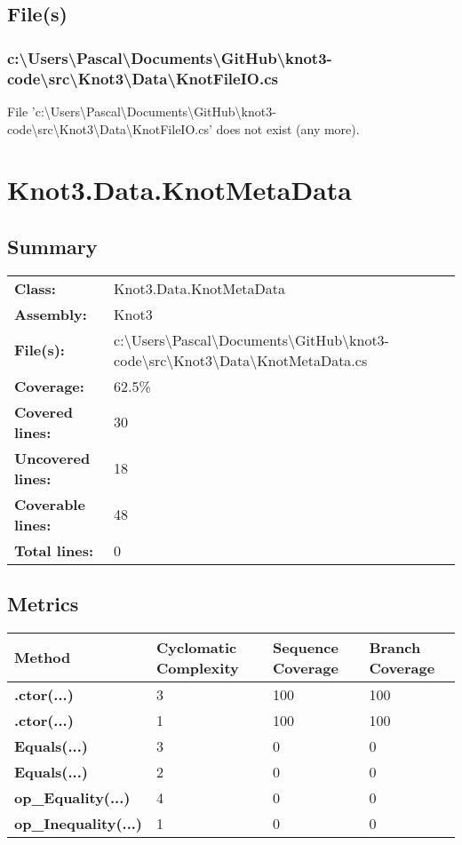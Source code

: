 \documentclass[a4paper,10pt]{article}
\begin{document}
\subsection{File(s)}
\subsubsection{c:\textbackslash Users\textbackslash Pascal\textbackslash Documents\textbackslash GitHub\textbackslash knot3-code\textbackslash src\textbackslash Knot3\textbackslash Data\textbackslash KnotFileIO.cs}
 File 'c:\textbackslash Users\textbackslash Pascal\textbackslash Documents\textbackslash GitHub\textbackslash knot3-code\textbackslash src\textbackslash Knot3\textbackslash Data\textbackslash KnotFileIO.cs' does not exist (any more).
\newpage
\section{Knot3.Data.KnotMetaData}
\subsection{Summary}
\begin{longtable}[l]{ll}
\textbf{Class:} & Knot3.Data.KnotMetaData\\
\textbf{Assembly:} & Knot3\\
\textbf{File(s):} & \begin{minipage}[t]{12cm}{c:\textbackslash Users\textbackslash Pascal\textbackslash Documents\textbackslash GitHub\textbackslash knot3-code\textbackslash src\textbackslash Knot3\textbackslash Data\textbackslash KnotMetaData.cs}\end{minipage} \\
\textbf{Coverage:} & 62.5\%\\
\textbf{Covered lines:} & 30\\
\textbf{Uncovered lines:} & 18\\
\textbf{Coverable lines:} & 48\\
\textbf{Total lines:} & 0\\
\end{longtable}
\subsection{Metrics}
\begin{longtable}[l]{|l|l|l|l|}
\hline
\textbf{Method} & \textbf{Cyclomatic Complexity} & \textbf{Sequence Coverage} & \textbf{Branch Coverage}\\
\hline
\textbf{.ctor(...)} & 3 & 100 & 100\\
\hline
\textbf{.ctor(...)} & 1 & 100 & 100\\
\hline
\textbf{Equals(...)} & 3 & 0 & 0\\
\hline
\textbf{Equals(...)} & 2 & 0 & 0\\
\hline
\textbf{op\_Equality(...)} & 4 & 0 & 0\\
\hline
\textbf{op\_Inequality(...)} & 1 & 0 & 0\\
\hline
\end{longtable}
\end{document}
